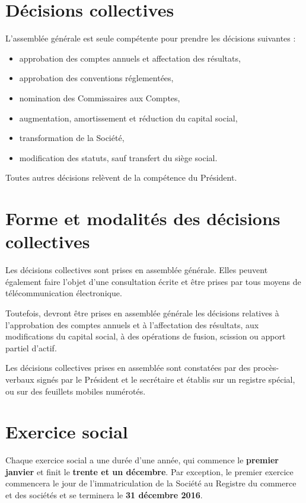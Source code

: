 \documentclass[a4paper,12pt]{report}
\begin{document}
\section{Décisions collectives}
L'assemblée générale est seule compétente pour prendre les décisions suivantes :
\begin{itemize}
	\item approbation des comptes annuels et affectation des résultats,
	\item approbation des conventions réglementées,
	\item nomination des Commissaires aux Comptes,
	\item augmentation, amortissement et réduction du capital social,
	\item transformation de la Société,
	\item modification des statuts, sauf transfert du siège social.
\end{itemize}

Toutes autres décisions relèvent de la compétence du Président.

\section{Forme et modalités des décisions collectives}
Les décisions collectives sont prises en assemblée générale. 
Elles peuvent également faire l'objet d'une consultation écrite et être prises par tous moyens de télécommunication électronique.

Toutefois, devront être prises en assemblée générale les décisions relatives à l'approbation des comptes annuels et à l'affectation des résultats, 
aux modifications du capital social, à des opérations de fusion, scission ou apport partiel d'actif.

Les décisions collectives prises en assemblée sont constatées par des procès-verbaux signés par le Président et le secrétaire et établis sur un registre spécial, 
ou sur des feuillets mobiles numérotés.

\section{Exercice social}
Chaque exercice social a une durée d'une année, qui commence le \textbf{premier janvier} et finit le \textbf{trente et un décembre}. 
Par exception, le premier exercice commencera le jour de l'immatriculation de la Société au Registre du commerce et des sociétés et se terminera le \textbf{31 décembre 2016}.
\end{document}
